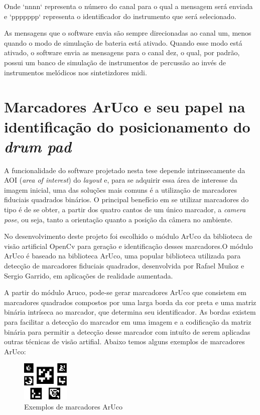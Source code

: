 \documentclass[12pt]{report}
\begin{document}
{Onde `nnnn` representa o número do canal para o qual a mensagem será
enviada e `ppppppp` representa o identificador do instrumento que será
selecionado.

As mensagens que o software envia são sempre direcionadas ao canal um, menos quando o modo de simulação de bateria está ativado. Quando esse modo está ativado, o software envia as mensagens para o canal dez, o qual, por padrão, possui um banco de simulação de instrumentos de percussão ao invés de instrumentos melódicos nos sintetizdores midi.

\chapter{Marcadores ArUco e seu papel na identificação do
  posicionamento do {\it drum pad}}
\label{cha:aruco}

A funcionalidade do software projetado nesta tese depende
intrinsecamente da AOI ({\it area of interest}) do {\it layout} e,
para se adquirir essa área de interesse da imagem inicial, uma das
soluções mais comuns é a utilização de marcadores fiduciais quadrados
binários. O principal benefício em se utilizar marcadores do tipo é de
se obter, a partir dos quatro cantos de um único marcador, a {\it
  camera pose}, ou seja, tanto a orientação quanto a posição da câmera
no ambiente.

No desenvolvimento deste projeto foi escolhido o módulo ArUco da biblioteca de visão artificial OpenCv para geração e identificação desses marcadores.O módulo ArUco é baseado na biblioteca ArUco, uma popular biblioteca utilizada para detecção de marcadores fiduciais quadrados, desenvolvida por Rafael Muñoz e Sergio Garrido, em aplicações de realidade aumentada.

A partir do módulo Aruco, pode-se gerar marcadores ArUco que consistem em marcadores quadrados compostos por uma larga borda da cor preta e uma matriz binária intríseca ao marcador, que determina seu identificador. As bordas existem para facilitar a detecção do marcador em uma imagem e a codificação da matriz binária para permitir a detecção desse marcador com intuíto de serem aplicadas outras técnicas de visão artifial. Abaixo temos alguns exemplos de marcadores ArUco:

\begin{figure}[H]
  \centering
    \includegraphics[width=0.2\textwidth]{imagens/markers.jpg}
    \caption{Exemplos de marcadores ArUco}
  \label{fig:arucoMarkers}
\end{figure}

}
\end{document}
